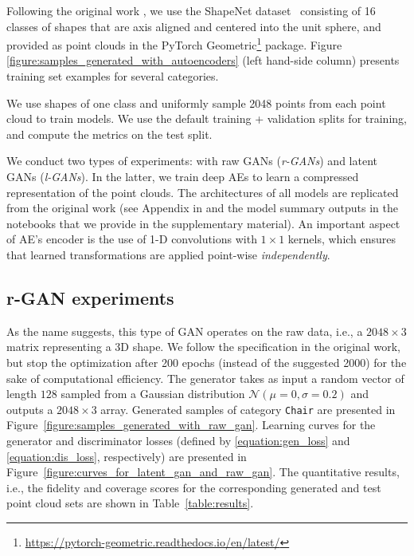 \documentclass[12pt]{article}
\begin{document}
    Following the original work \cite{pmlr-v80-achlioptas18a}, we use the ShapeNet dataset~\cite{arxiv:1512.03012} consisting of 16 classes of shapes
    that are axis aligned and centered into the unit sphere, and provided as point clouds in the PyTorch Geometric\footnote{\url{https://pytorch-geometric.readthedocs.io/en/latest/}} package. Figure \ref{figure:samples_generated_with_autoencoders} (left hand-side column) presents training set examples for several categories.

    We use shapes of one class and uniformly sample 2048 points from each point cloud to train models. We use the default training + validation splits for training, and compute the metrics on the test split.

    We conduct two types of experiments: with raw GANs (\textit{r-GANs}) and latent GANs (\textit{l-GANs}). In the latter, we train deep AEs to learn a compressed representation of the point clouds. The architectures of all models are replicated from the original work (see Appendix in \cite{pmlr-v80-achlioptas18a} and the model summary outputs in the notebooks that we provide in the supplementary material). An important aspect of AE's encoder is the use of 1-D convolutions with $1 \times 1$ kernels, which ensures that learned transformations are applied point-wise \textit{independently}.

    \subsection{r-GAN experiments} As the name suggests, this type of GAN operates on the raw data, i.e., a $2048 \times 3$ matrix representing a 3D shape. We follow the specification in the original work, but stop the optimization after 200 epochs (instead of the suggested 2000) for the sake of computational efficiency. The generator takes as input a random vector of length $128$ sampled from a Gaussian distribution $\mathcal{N}(\mu=0,\sigma=0.2)$ and outputs a $2048 \times 3$ array.
    Generated samples of category \verb|Chair| are presented in Figure~\ref{figure:samples_generated_with_raw_gan}. Learning curves for the generator and discriminator losses (defined by \eqref{equation:gen_loss} and \eqref{equation:dis_loss}, respectively) are presented in Figure~\ref{figure:curves_for_latent_gan_and_raw_gan}.
    The quantitative results, i.e., the fidelity and coverage scores for the corresponding generated and test point cloud sets are shown in Table~\ref{table:results}.
\end{document}

